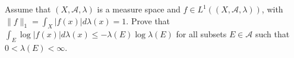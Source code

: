 Assume that $(X,\mathcal{A},\lambda)$ is a measure space and $f\in
L^1((X,\mathcal{A},\lambda))$, with
$\|f\|_1=\int_X|f(x)|d\lambda(x)=1$. Prove that $\int_E\log |f(x)|
d\lambda(x)\leq -\lambda(E)\log \lambda(E)$ for all subsets $E\in
\mathcal{A}$ such that $0<\lambda(E)<\infty$. 
